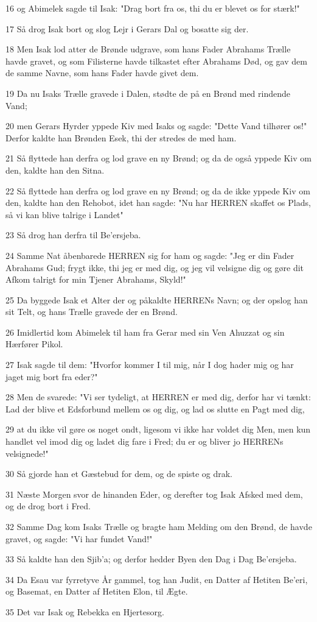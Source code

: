 \par 16 og Abimelek sagde til Isak: "Drag bort fra os, thi du er blevet os for stærk!"
\par 17 Så drog Isak bort og slog Lejr i Gerars Dal og bosatte sig der.
\par 18 Men Isak lod atter de Brønde udgrave, som hans Fader Abrahams Trælle havde gravet, og som Filisterne havde tilkastet efter Abrahams Død, og gav dem de samme Navne, som hans Fader havde givet dem.
\par 19 Da nu Isaks Trælle gravede i Dalen, stødte de på en Brønd med rindende Vand;
\par 20 men Gerars Hyrder yppede Kiv med Isaks og sagde: "Dette Vand tilhører os!" Derfor kaldte han Brønden Esek, thi der stredes de med ham.
\par 21 Så flyttede han derfra og lod grave en ny Brønd; og da de også yppede Kiv om den, kaldte han den Sitna.
\par 22 Så flyttede han derfra og lod grave en ny Brønd; og da de ikke yppede Kiv om den, kaldte han den Rehobot, idet han sagde: "Nu har HERREN skaffet os Plads, så vi kan blive talrige i Landet"
\par 23 Så drog han derfra til Be'ersjeba.
\par 24 Samme Nat åbenbarede HERREN sig for ham og sagde: "Jeg er din Fader Abrahams Gud; frygt ikke, thi jeg er med dig, og jeg vil velsigne dig og gøre dit Afkom talrigt for min Tjener Abrahams, Skyld!"
\par 25 Da byggede Isak et Alter der og påkaldte HERRENs Navn; og der opslog han sit Telt, og hans Trælle gravede der en Brønd.
\par 26 Imidlertid kom Abimelek til ham fra Gerar med sin Ven Ahuzzat og sin Hærfører Pikol.
\par 27 Isak sagde til dem: "Hvorfor kommer I til mig, når I dog hader mig og har jaget mig bort fra eder?"
\par 28 Men de svarede: "Vi ser tydeligt, at HERREN er med dig, derfor har vi tænkt: Lad der blive et Edsforbund mellem os og dig, og lad os slutte en Pagt med dig,
\par 29 at du ikke vil gøre os noget ondt, ligesom vi ikke har voldet dig Men, men kun handlet vel imod dig og ladet dig fare i Fred; du er og bliver jo HERRENs velsignede!"
\par 30 Så gjorde han et Gæstebud for dem, og de spiste og drak.
\par 31 Næste Morgen svor de hinanden Eder, og derefter tog Isak Afsked med dem, og de drog bort i Fred.
\par 32 Samme Dag kom Isaks Trælle og bragte ham Melding om den Brønd, de havde gravet, og sagde: "Vi har fundet Vand!"
\par 33 Så kaldte han den Sjib'a; og derfor hedder Byen den Dag i Dag Be'ersjeba.
\par 34 Da Esau var fyrretyve År gammel, tog han Judit, en Datter af Hetiten Be'eri, og Basemat, en Datter af Hetiten Elon, til Ægte.
\par 35 Det var Isak og Rebekka en Hjertesorg.

